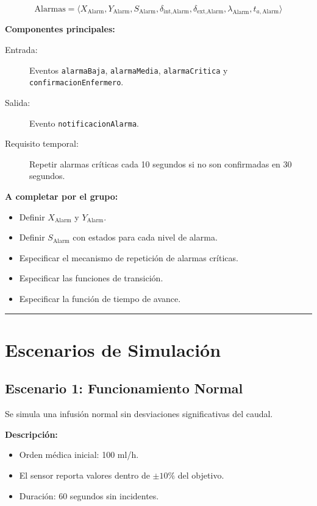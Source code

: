 \documentclass[12pt,a4paper,oneside]{report}
\begin{document}
\[
\text{Alarmas} = \langle X_{\text{Alarm}}, Y_{\text{Alarm}}, S_{\text{Alarm}}, \delta_{\text{int},\text{Alarm}}, \delta_{\text{ext},\text{Alarm}}, \lambda_{\text{Alarm}}, t_{a,\text{Alarm}} \rangle
\]

\textbf{Componentes principales:}

\begin{description}
    \item[Entrada:] Eventos \texttt{alarmaBaja}, \texttt{alarmaMedia}, \texttt{alarmaCritica} y \texttt{confirmacionEnfermero}.
    \item[Salida:] Evento \texttt{notificacionAlarma}.
    \item[Requisito temporal:] Repetir alarmas críticas cada 10 segundos si no son confirmadas en 30 segundos.
\end{description}

\textbf{A completar por el grupo:}

\begin{itemize}
    \item Definir $X_{\text{Alarm}}$ y $Y_{\text{Alarm}}$.
    \item Definir $S_{\text{Alarm}}$ con estados para cada nivel de alarma.
    \item Especificar el mecanismo de repetición de alarmas críticas.
    \item Especificar las funciones de transición.
    \item Especificar la función de tiempo de avance.
\end{itemize}

\noindent\rule{\textwidth}{0.5pt}

\chapter{Escenarios de Simulación}

\section{Escenario 1: Funcionamiento Normal}

Se simula una infusión normal sin desviaciones significativas del caudal.

\textbf{Descripción:}
\begin{itemize}
    \item Orden médica inicial: 100 ml/h.
    \item El sensor reporta valores dentro de $\pm 10\%$ del objetivo.
    \item Duración: 60 segundos sin incidentes.
\end{itemize}
\end{document}
